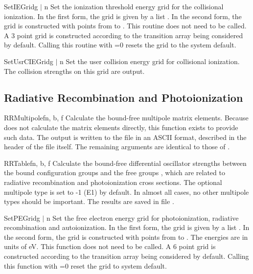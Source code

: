 \begin{fundesc}{SetIEGrid}{g $\mid$ n}
Set the ionization threshold energy grid for the collisional ionization. In
the first form, the grid is given by a list . In the second
form, the grid is constructed with  points from  to
. This routine does not need to be called. A 3 point grid is
constructed according to the transition array being considered by default.
Calling this routine with =0 resets the grid to the system default.
\end{fundesc}

\begin{fundesc}{SetUsrCIEGrid}{g $\mid$ n}
Set the user collision energy grid for collisional ionization. The collision
strengths on this grid are output.
\end{fundesc}



\subsection{Radiative Recombination and Photoionization}

\begin{fundesc}{RRMultipole}{fn, b, f}
Calculate the bound-free multipole matrix elements. Because 
does not calculate the matrix elements directly, this function exists to provide
such data. The output is written to the file  in an ASCII format,
described in the header of the file itself. The remaining arguments are
identical to those of .
\end{fundesc}

\begin{fundesc}{RRTable}{fn, b, f}
Calculate the bound-free differential oscillator strengths between the bound
configuration groups  and the free groups , which are related to
radiative recombination and photoionization cross sections. The optional
multipole type  is set to -1 (E1) by default. In almost all cases, no
other multipole types should be important. The results are saved in file
.
\end{fundesc}


\begin{fundesc}{SetPEGrid}{g $\mid$ n}
Set the free electron energy grid for photoionization, radiative recombination
and autoionization. In the first form, the grid is given by a list
. In the second form, the grid is constructed with  points from
 to . The energies are in units of eV. This function does not
need to be called. A 6 point grid is constructed according to the transition
array being considered by default. Calling this function with =0 reset
the grid to system default.
\end{fundesc}


